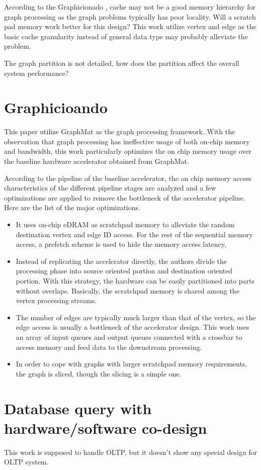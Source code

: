 According to the Graphicionado \cite{hamgra2016phicionado}, cache may not be a good memory hierarchy for graph processing as the graph problems typically has poor locality. Will a scratch pad memory work better for this design? This work utilize vertex and edge as the basic cache granularity instead of general data type may probably alleviate the problem.

The graph partition is not detailed, how does the partition affect the overall system performance? 


\section{Graphicioando}
This paper utilize GraphMat \cite{sundaram2015graphmat} as the graph processing framework. With the observation that graph processing has ineffective usage of both on-chip memory and bandwidth, this work particularly optimizes the on chip memory usage over the baseline hardware accelerator obtained from GraphMat. 

According to the pipeline of the baseline accelerator, the on chip memory access characteristics of the different pipeline stages are analyzed and a few optimizations are applied to remove the bottleneck of the accelerator pipeline. Here are the list of the major optimizations.
\begin{itemize}
    \item It uses on-chip eDRAM as scratchpad memory to alleviate the random destination vertex and edge ID access. For the rest of the sequential memory access, a prefetch scheme is used to hide the memory access latency,
    \item Instead of replicating the accelerator directly, the authors divide the processing phase into source oriented portion and destination oriented portion. With this strategy, the hardware can be easily partitioned into parts without overlaps. Basically, the scratchpad memory is shared among the vertex processing streams. 
    \item The number of edges are typically much larger than that of the vertex, so the edge access is usually a bottleneck of the accelerator design. This work uses an array of input queues and output queues connected with a crossbar to access memory and feed data to the downstream processing. 
    \item In order to cope with graphs with larger scratchpad memory requirements, the graph is sliced, though the slicing is a simple one.
\end{itemize}

\section{Database query with hardware/software co-design}
This work is supposed to handle OLTP, but it doesn't show any special design for OLTP system.

